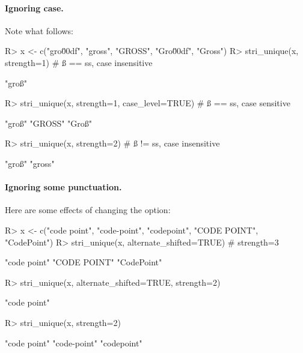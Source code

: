 \documentclass[nojss]{jss}
\begin{document}
\paragraph{Ignoring case.}
Note what follows:

\begin{Schunk}
\begin{Sinput}
R> x <- c("gro\u00df", "gross", "GROSS", "Gro\u00df", "Gross")
R> stri_unique(x, strength=1)                  # ß == ss, case insensitive
\end{Sinput}
\begin{Soutput}
[1] "groß"
\end{Soutput}
\begin{Sinput}
R> stri_unique(x, strength=1, case_level=TRUE) # ß == ss, case sensitive
\end{Sinput}
\begin{Soutput}
[1] "groß"  "GROSS" "Groß"
\end{Soutput}
\begin{Sinput}
R> stri_unique(x, strength=2)                  # ß != ss, case insensitive
\end{Sinput}
\begin{Soutput}
[1] "groß"  "gross"
\end{Soutput}
\end{Schunk}

\paragraph{Ignoring some punctuation.}
Here are some effects of changing the   option:


\begin{Schunk}
\begin{Sinput}
R> x <- c("code point", "code-point", "codepoint", "CODE POINT", "CodePoint")
R> stri_unique(x, alternate_shifted=TRUE)  # strength=3
\end{Sinput}
\begin{Soutput}
[1] "code point" "CODE POINT" "CodePoint"
\end{Soutput}
\begin{Sinput}
R> stri_unique(x, alternate_shifted=TRUE, strength=2)
\end{Sinput}
\begin{Soutput}
[1] "code point"
\end{Soutput}
\begin{Sinput}
R> stri_unique(x, strength=2)
\end{Sinput}
\begin{Soutput}
[1] "code point" "code-point" "codepoint"
\end{Soutput}
\end{Schunk}
\end{document}
